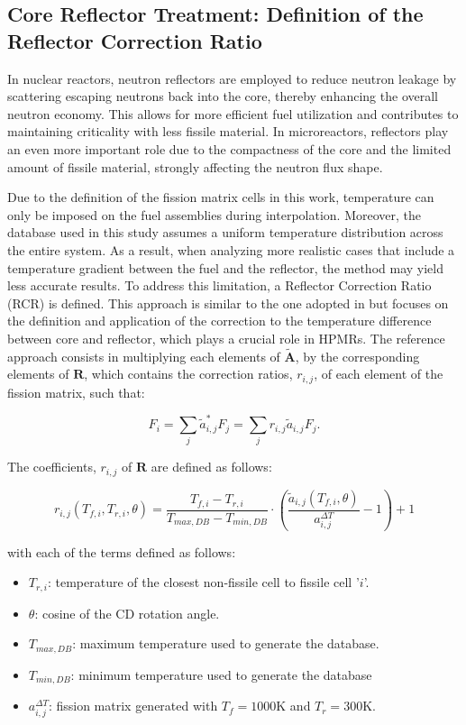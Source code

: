\documentclass[preprint,review,12pt]{elsarticle}
\begin{document}
\subsection{Core Reflector Treatment: Definition of the Reflector Correction Ratio}
In nuclear reactors, neutron reflectors are employed to reduce neutron leakage by scattering escaping neutrons back into the core, thereby enhancing the overall neutron economy. This allows for more efficient fuel utilization and contributes to maintaining criticality with less fissile material. In microreactors, reflectors play an even more important role due to the compactness of the core and the limited amount of fissile material, strongly affecting the neutron flux shape.

Due to the definition of the fission matrix cells in this work, temperature can only be imposed on the fuel assemblies during interpolation. Moreover, the database used in this study assumes a uniform temperature distribution across the entire system. As a result, when analyzing more realistic cases that include a temperature gradient between the fuel and the reflector, the method may yield less accurate results. To address this limitation, a Reflector Correction Ratio (RCR) is defined. This approach is similar to the one adopted in \cite{Rau2020} but focuses on the definition and application of the correction to the temperature difference between core and reflector, which plays a crucial role in HPMRs. The reference approach consists in multiplying each elements of $\tilde{\textbf{A}}$, by the corresponding elements of $\textbf{R}$, which contains the correction ratios,  $r_{i,j}$,  of each element of the fission matrix, such that: 

\begin{equation}
F_i = \sum_j \tilde{a}_{i,j}^{*}F_j = \sum_j r_{i,j}\tilde{a}_{i,j}F_j.
\label{eq:fission_source_with_correction_calculation}
\end{equation}

The coefficients, $r_{i,j}$ of $\textbf{R}$ are defined as follows: 

\begin{equation}
r_{i,j}(T_{f,i}, T_{r,i}, \theta) = \frac{T_{f,i} - T_{r,i}}{T_{max,DB} - T_{min,DB}} \cdot \left( \frac{ \tilde{a}_{i,j}(T_{f,i}, \theta)}{a_{i,j}^{\Delta T}} - 1 \right) + 1
\label{eq:correction_ratio_1}
\end{equation}

with each of the terms defined as follows: 

\begin{itemize}
    \item $T_{r,i}$: temperature of the closest non-fissile cell to fissile cell '$i$'. 
    \item $ \theta $: cosine of the CD rotation angle.     
    \item $T_{max,DB}$: maximum temperature used to generate the database.  
    \item $T_{min,DB}$: minimum temperature used to generate the database 
    \item $a_{i,j}^{\Delta T}$: fission matrix generated with $T_{f}=1000$K and $T_{r}=300$K.   
\end{itemize}
\end{document}
